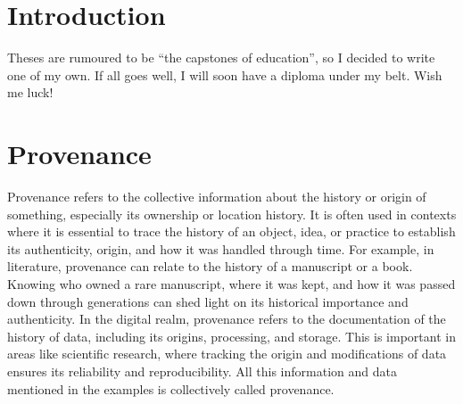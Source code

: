 \documentclass[
  digital,     %
  oneside,     %
  nosansbold,  %
  nocolorbold, %
  lof,         %
  lot,         %
]{fithesis4}
\begin{document}
\chapter*{Introduction}

Theses are rumoured to be \enquote{the capstones of education}, so
I decided to write one of my own. If all goes well, I will soon
have a diploma under my belt. Wish me luck!


\chapter{Provenance}
\shorthandoff{-}
Provenance refers to the collective information about the history or origin of something, especially its ownership or location history. It is often used in contexts where it is essential to trace the history of an object, idea, or practice to establish its authenticity, origin, and how it was handled through time. For example, in literature, provenance can relate to the history of a manuscript or a book. Knowing who owned a rare manuscript, where it was kept, and how it was passed down through generations can shed light on its historical importance and authenticity. In the digital realm, provenance refers to the documentation of the history of data, including its origins, processing, and storage. This is important in areas like scientific research, where tracking the origin and modifications of data ensures its reliability and reproducibility. All this information and data mentioned in the examples is collectively called provenance.
\shorthandon{-}
\end{document}
